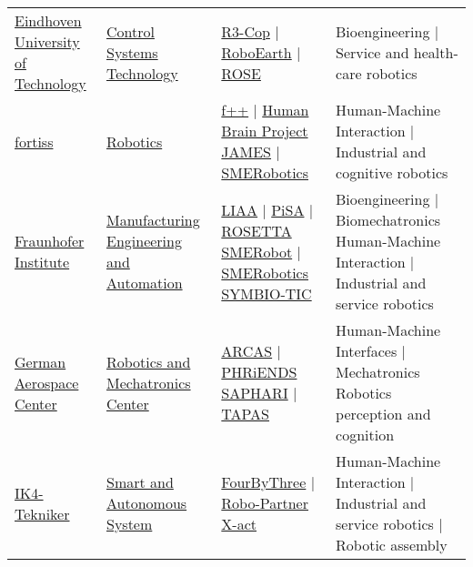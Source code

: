 \begin{table}[H]
\begin{tabu} { X[m,c] X[0.9,m,c] X[1.2,m,c] X[1.8,m,c] }
		\tabucline[1pt on 1.5pt off 3pt]{-}
		\href{https://www.tue.nl/en}{Eindhoven University of Technology} &
		\href{https://www.tue.nl/en/research/research-institutes/robotics-research/research-groups/control-systems-technology/}{Control Systems Technology} &
		\href{https://www.tue.nl/en/research/research-institutes/robotics-research/projects/r3-cop/}{R3-Cop} | \href{http://roboearth.org/}{RoboEarth} | \href{https://www.tue.nl/en/research/research-institutes/robotics-research/projects/rose/}{ROSE} &
		Bioengineering | Service and health-care robotics \\

		\tabucline[1pt on 1.5pt off 3pt]{-}
		\href{http://www.fortiss.org/en/home/}{fortiss} &
		\href{http://www.fortiss.org/en/research/research-topic/robotics/}{Robotics} &
		\href{http://www.fortiss.org/en/research/projects/fortiss_future_factory_f/}{f++} | \href{https://www.humanbrainproject.eu/}{Human Brain Project} \href{http://www.james-project.eu/}{JAMES} | \href{http://www.smerobotics.org/AUTOMATICA/exhibit-03-2016.html}{SMERobotics} &
		Human-Machine Interaction | Industrial and cognitive robotics \\

		\tabucline[1pt on 1.5pt off 3pt]{-}
		\href{https://www.fraunhofer.de/en.html}{Fraunhofer Institute} &
		\href{http://www.ipa.fraunhofer.de/en.html}{Manufacturing Engineering and Automation} &
		\href{http://www.project-leanautomation.eu}{LIAA} | \href{http://www.pisa-ip.org}{PiSA} | \href{http://www.fp7rosetta.org}{ROSETTA} \href{http://www.smerobot.org}{SMERobot} | \href{http://www.smerobotics.org/AUTOMATICA/exhibit-08-2016.html}{SMERobotics} \href{http://www.symbio-tic.eu}{SYMBIO-TIC} &
		Bioengineering | Biomechatronics Human-Machine Interaction | Industrial and service robotics \\

		\tabucline[1pt on 1.5pt off 3pt]{-}
		\href{http://www.dlr.de/dlr/en}{German Aerospace Center} &
		\href{http://www.dlr.de/rm/en}{Robotics and Mechatronics Center} &
		\href{http://www.arcas-project.eu}{ARCAS} | \href{http://www.phriends.eu/}{PHRiENDS} \href{http://www.saphari.eu}{SAPHARI} | \href{http://tapas-project.eu/}{TAPAS} &
		Human-Machine Interfaces | Mechatronics Robotics perception and cognition \\

		\tabucline[1pt on 1.5pt off 3pt]{-}
		\href{http://www.tekniker.es/en}{IK4-Tekniker} &
		\href{http://www.tekniker.es/en/automation-and-industrial-robotics}{Smart and Autonomous System} &
		\href{http://fourbythree.eu/}{FourByThree} | \href{http://www.robo-partner.eu}{Robo-Partner} \href{http://www.xact-project.eu}{X-act} &
		Human-Machine Interaction | Industrial and service robotics | Robotic assembly \\


\end{tabu}
\end{table}
